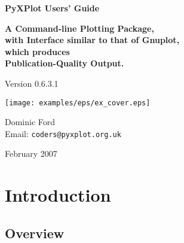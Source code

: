 \documentclass[a4paper,onecolumn,11pt]{book}
\def\version{0.6.3.1}
\def\reldate{February 2007}
\begin{document}
\begin{titlepage}
\normalsize
\vspace*{0.5cm}
\begin{center}
{\Huge \bf PyXPlot Users' Guide}\\
\end{center}
\vspace*{0.5cm}
\begin{center}
{\LARGE \bf A Command-line Plotting Package, \\ \vspace{2mm} with Interface similar to that of Gnuplot, \\ \vspace{2mm} which produces \\ \vspace{2mm} Publication-Quality Output. \\}
\end{center}
\vspace*{0.5cm}
\begin{center}
{\Large Version \version \\}
\end{center}
\vspace*{0.0cm}
\begin{center}
\texttt{[image: examples/eps/ex\_cover.eps]}
\end{center}
\vspace*{0.0cm}
\begin{center}
{\Large Dominic Ford \\ \vspace{2mm} Email: \noindent \texttt{coders@pyxplot.org.uk} \\ }
\end{center}
\vspace*{0.5cm}
\begin{center}
{\Large \reldate \\}
\end{center}
\end{titlepage}


\tableofcontents

\chapter{Introduction}

\label{introduction}

\section{Overview}
\end{document}
